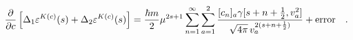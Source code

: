 \begin{equation}
\frac{\partial}{\partial c}\left[\Delta_1 \varepsilon^{K(c)}(s)+
\Delta_2 \varepsilon^{K(c)}(s)\right]=\frac{\hbar m}{2}\mu^{2s+1}
\sum_{n=1}^\infty\sum_{a=1}^2\frac{[c_n]_a\gamma[s+n+\frac{1}{2},v_a^2]}{\sqrt{4\pi}\,
v_a^{2(s+n+\frac{1}{2})}}+{\rm error}  \quad . \label{eq:derq}
\end{equation}

